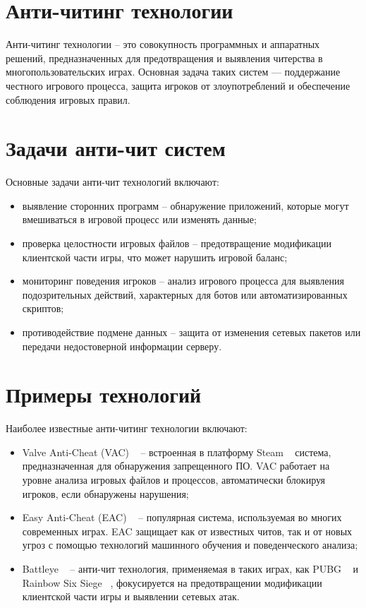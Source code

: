 \section{Анти-читинг технологии}
Анти-читинг технологии -- это совокупность программных и аппаратных решений, предназначенных для предотвращения и выявления читерства в многопользовательских играх. Основная задача таких систем — поддержание честного игрового процесса, защита игроков от злоупотреблений и обеспечение соблюдения игровых правил.

\section{Задачи анти-чит систем}
Основные задачи анти-чит технологий включают:
\begin{itemize}
	\item выявление сторонних программ -- обнаружение приложений, которые могут вмешиваться в игровой процесс или изменять данные;
	\item проверка целостности игровых файлов -- предотвращение модификации клиентской части игры, что может нарушить игровой баланс;
	\item мониторинг поведения игроков -- анализ игрового процесса для выявления подозрительных действий, характерных для ботов или автоматизированных скриптов;
	\item противодействие подмене данных -- защита от изменения сетевых пакетов или передачи недостоверной информации серверу.
\end{itemize}

\section{Примеры технологий}
Наиболее известные анти-читинг технологии включают:
\begin{itemize}
	\item Valve Anti-Cheat (VAC) ~\cite{b5} -- встроенная в платформу Steam ~\cite{b11} система, предназначенная для обнаружения запрещенного ПО. VAC работает на уровне анализа игровых файлов и процессов, автоматически блокируя игроков, если обнаружены нарушения;
	\item Easy Anti-Cheat (EAC) ~\cite{b6} -- популярная система, используемая во многих современных играх. EAC защищает как от известных читов, так и от новых угроз с помощью технологий машинного обучения и поведенческого анализа;
	\item Battleye ~\cite{b7} -- анти-чит технология, применяемая в таких играх, как PUBG ~\cite{b9} и Rainbow Six Siege ~\cite{b10}, фокусируется на предотвращении модификации клиентской части игры и выявлении сетевых атак.
\end{itemize}

